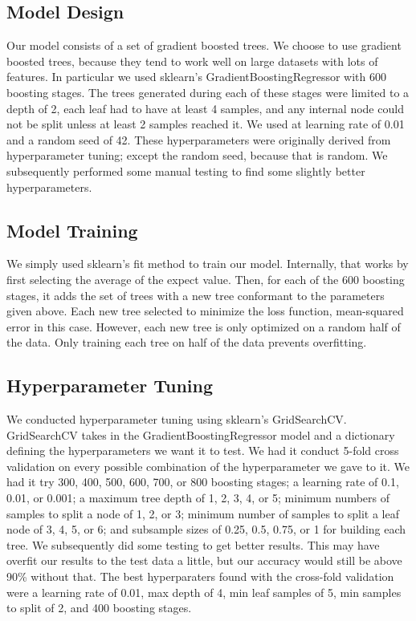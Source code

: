 \documentclass{article}
\begin{document}
\subsection{Model Design}

Our model consists of a set of gradient boosted trees. We choose to use gradient boosted trees, because they tend to work well on large datasets with lots of features. In particular we used sklearn's GradientBoostingRegressor with 600 boosting stages. The trees generated during each of these stages were limited to a depth of 2, each leaf had to have at least 4 samples, and any internal node could not be split unless at least 2 samples reached it. We used at learning rate of 0.01 and a random seed of 42. These hyperparameters were originally derived from hyperparameter tuning; except the random seed, because that is random. We subsequently performed some manual testing to find some slightly better hyperparameters. 

\subsection{Model Training}

We simply used sklearn's fit method to train our model. Internally, that works by first selecting the average of the expect value. Then, for each of the 600 boosting stages, it adds the set of trees with a new tree conformant to the parameters given above. Each new tree selected to minimize the loss function, mean-squared error in this case. However, each new tree is only optimized on a random half of the data. Only training each tree on half of the data prevents overfitting. 

\subsection{Hyperparameter Tuning}

We conducted hyperparameter tuning using sklearn's GridSearchCV. GridSearchCV takes in the GradientBoostingRegressor model and a dictionary defining the hyperparameters we want it to test. We had it conduct 5-fold cross validation on every possible combination of the hyperparameter we gave to it. We had it try 300, 400, 500, 600, 700, or 800 boosting stages; a learning rate of 0.1, 0.01, or 0.001; a maximum tree depth of 1, 2, 3, 4, or 5; minimum numbers of samples to split a node of 1, 2, or 3; minimum number of samples to split a leaf node of 3, 4, 5, or 6; and subsample sizes of 0.25, 0.5, 0.75, or 1 for building each tree. We subsequently did some testing to get better results. This may have overfit our results to the test data a little, but our accuracy would still be above 90\% without that. The best hyperparaters found with the cross-fold validation were a learning rate of 0.01, max depth of 4, min leaf samples of 5, min samples to split of 2, and 400 boosting stages. 
\end{document}
